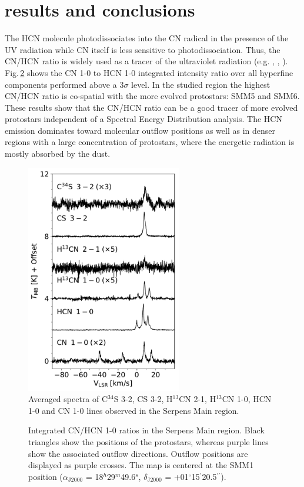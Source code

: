 \documentclass[a4paper]{article}
\begin{document}
\section*{\sc results and conclusions}
\indent \indent The HCN molecule photodissociates into the CN radical in the presence of the UV radiation while CN itself is less sensitive to photodissociation. Thus, the CN/HCN ratio is widely used as a tracer of the ultraviolet radiation (e.g. \cite{fuente1995}, \cite{chapillon2012}, \cite{riaz2018}). Fig.\,\ref{fig2} shows the CN 1-0 to HCN 1-0 integrated intensity ratio over all hyperfine components performed above a $3\sigma$ level. In the studied region the highest CN/HCN ratio is co-spatial with the more evolved protostars: SMM5 and SMM6. These results show that the CN/HCN ratio can be a good tracer of more evolved protostars independent of a Spectral Energy Distribution analysis. The HCN emission dominates toward molecular outflow positions as well as in denser regions with a large concentration of protostars, where the energetic radiation is mostly absorbed by the dust.

\begin{figure}[!h]
\centering
\includegraphics[height=10cm]{serpens_spectra.pdf}
\caption{Averaged spectra of C$^{34}$S 3-2, CS 3-2, H$^{13}$CN 2-1, H$^{13}$CN 1-0, HCN 1-0 and CN 1-0 lines observed in the Serpens Main region.}
\label{fig1}
\end{figure}

\begin{figure}[!h]
\centering
{}
\caption{Integrated CN/HCN 1-0 ratios in the Serpens Main region. Black triangles show the positions of the protostars, whereas purple lines show the associated outflow directions. Outflow positions are displayed as purple crosses. The map is centered at the SMM1 position ($\alpha_\mathrm{J2000}$ = 18$^h$29$^m$49.6$^s$, $\delta_\mathrm{J2000}$ = +01$^{\circ}$15$^{\prime}$20.5$^{\prime\prime}$).}
\label{fig2}
\end{figure}
\end{document}
